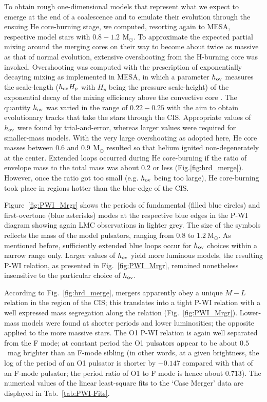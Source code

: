 \documentclass[a4paper,fleqn,usenatbib]{mnras}
\newcommand{\msol}{~\mathrm{M}_\odot}
\begin{document}
To obtain rough one-dimensional models that represent what we expect to emerge 
at the end of a coalescence and to emulate their evolution through the ensuing 
He core-burning stage, we computed, resorting again to MESA, respective 
model stars with $0.8 - 1.2\,\msol$. To approximate the expected partial 
mixing around the merging cores on their way to become about twice as massive 
as that of normal evolution, extensive overshooting from the H-burning core was invoked.  
Overshooting was computed with the prescription of exponentially decaying mixing 
as implemented in MESA, in which a parameter $h_{\rm ov}$  measures the 
scale-length ($h_{\rm ov}H_p$ with $H_p$ being the pressure scale-height) of the exponential 
decay of the mixing efficiency above the convective core \citep{Herwig2000}. 
The quantity  $h_{\rm ov}$ was varied in the range of $0.22 - 0.25$ with the aim to 
obtain evolutionary tracks that take the stars through the CIS.  Appropriate values 
of $h_{\rm ov}$ were found by trial-and-error, whereas larger values were required 
for smaller-mass models. With the very large overshooting as adopted here, He core masses between 
$0.6$ and $0.9 \,\msol$ resulted so that helium ignited non-degenerately at the center.  
Extended loops occurred during He core-burning if the ratio of envelope mass to the total 
mass was about $0.2$ or less (Fig.\ref{fig:hrd_merge}). However, once the ratio got too small 
(e.g. $h_{\rm ov}$ being too large),  He core-burning took place in regions hotter than 
the blue-edge of the CIS.

Figure~\ref{fig:PWI_Mrgr} shows the periods of fundamental (filled blue circles) 
and first-overtone (blue asterisks) modes at the respective blue edges in the P-WI 
diagram showing again LMC observations in lighter grey. 
The size of the symbols reflects the mass of 
the model pulsators, ranging from $0.8$ to $1.2 \msol$. 
As mentioned before, sufficiently extended blue loops occur for $h_{\rm ov}$ choices 
within a narrow range only. Larger values of $h_{\rm ov}$ yield more luminous models, the 
resulting P-WI relation, as presented in Fig.~\ref{fig:PWI_Mrgr}, 
remained nonetheless insensitive to the particular choice of $h_{\rm ov}$. 

According to Fig.~\ref{fig:hrd_merge}, mergers apparently obey a unique $M-L$ relation 
in the region of the CIS; this translates into a tight P-WI relation with a well expressed 
mass segregation along the relation (Fig.~\ref{fig:PWI_Mrgr}). 
Lower-mass models were found at shorter periods and lower luminosities; the opposite applied 
to the more massive stars. The O1 P-WI relation is again well separated from the 
F mode; at constant period the O1 pulsators appear to be about $0.5$~mag brighter than 
an F-mode sibling (in other words, at a given brightness, the log of the period of an 
O1 pulsator is shorter by $-0.147$ compared with that of an F-mode pulsator; the period 
ratio of O1 to F mode is hence about $0.713$). The numerical values of the linear 
least-square fits to the `Case Merger' data are displayed in Tab.~\ref{tab:PWI-Fits}.
 
\end{document}
